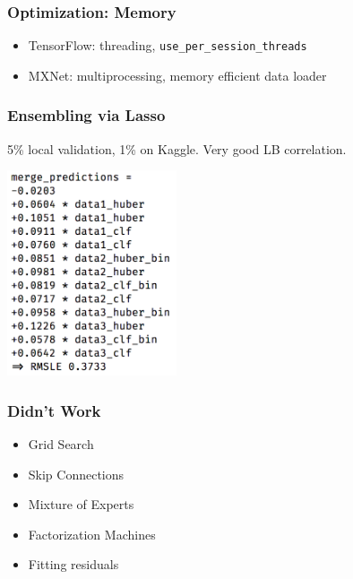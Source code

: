 \begin{frame}
    \frametitle{Optimization: Memory}

    \begin{itemize}
        \item TensorFlow: threading, \texttt{use\_per\_session\_threads}
        \item MXNet: multiprocessing, memory efficient data loader
    \end{itemize}

\end{frame}

\begin{frame}
\frametitle{Ensembling via Lasso}
    5\% local validation, 1\% on Kaggle.
    Very good LB correlation.

    \hspace{2cm}

    \includegraphics[width=5cm]{img/lasso.png}

\end{frame}

\begin{frame}
    \frametitle{Didn't Work}

    \begin{itemize}
        \item Grid Search
        \item Skip Connections
        \item Mixture of Experts
        \item Factorization Machines
        \item Fitting residuals
    \end{itemize}

\end{frame}
